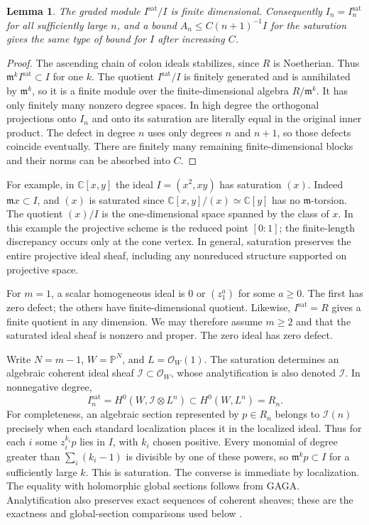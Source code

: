 \documentclass[11pt,reqno]{amsart}
\numberwithin{equation}{section}
\newtheorem{lemma}[theorem]{Lemma}
\theoremstyle{definition}
\theoremstyle{remark}
\newcommand{\C}{\mathbb C}
\newcommand{\Pj}{\mathbb P}
\newcommand{\cO}{\mathcal O}
\newcommand{\cI}{\mathcal I}
\begin{document}
\begin{lemma}\label{geo:saturation}
The graded module $I^{\mathrm{sat}}/I$ is finite dimensional.
Consequently $I_n=I_n^{\mathrm{sat}}$ for all sufficiently large $n$,
and a bound $A_n\le C(n+1)^{-1}I$ for the saturation gives the same
type of bound for $I$ after increasing $C$.
\end{lemma}
\begin{proof}
The ascending chain of colon ideals stabilizes, since $R$ is Noetherian.
Thus $\mathfrak m^k I^{\mathrm{sat}}\subset I$ for one $k$.
The quotient $I^{\mathrm{sat}}/I$ is finitely generated and is annihilated
by $\mathfrak m^k$, so it is a finite module over the finite-dimensional
algebra $R/\mathfrak m^k$.  It has only finitely many nonzero degree
spaces.  In high degree the orthogonal projections onto $I_n$ and onto
its saturation are literally equal in the original inner product.
The defect in degree $n$ uses only degrees $n$ and $n+1$, so those
defects coincide eventually.  There are finitely many remaining
finite-dimensional blocks and their norms can be absorbed into $C$.
\end{proof}

For example, in $\C[x,y]$ the ideal $I=(x^2,xy)$ has saturation $(x)$.
Indeed $\mathfrak m x\subset I$, and $(x)$ is saturated since
$\C[x,y]/(x)\simeq\C[y]$ has no $\mathfrak m$-torsion. The quotient
$(x)/I$ is the one-dimensional space spanned by the class of $x$.
In this example the projective scheme is the reduced point $[0:1]$;
the finite-length discrepancy occurs only at the cone vertex. In general,
saturation preserves the entire projective ideal sheaf, including any
nonreduced structure supported on projective space.

For $m=1$, a scalar homogeneous ideal is $0$ or $(z_1^a)$ for some
$a\ge0$.  The first has zero defect; the others have finite-dimensional
quotient.  Likewise, $I^{\mathrm{sat}}=R$ gives a finite quotient in
any dimension.  We may therefore assume $m\ge2$ and that the saturated
ideal sheaf is nonzero and proper.  The zero ideal has zero defect.

Write $N=m-1$, $W=\Pj^N$, and $L=\cO_W(1)$.  The saturation determines
an algebraic coherent ideal sheaf $\cI\subset\cO_W$, whose
analytification is also denoted $\cI$.  In nonnegative degree,
\begin{equation}\label{eq:geo-sections}
 I^{\mathrm{sat}}_n=H^0(W,\cI\otimes L^n)\subset H^0(W,L^n)=R_n.
\end{equation}
For completeness, an algebraic section represented by $p\in R_n$
belongs to $\cI(n)$ precisely when each standard localization places
it in the localized ideal.  Thus for each $i$ some $z_i^{k_i}p$ lies
in $I$, with $k_i$ chosen positive.  Every monomial of degree greater than
$\sum_i(k_i-1)$ is divisible by one of these powers, so
$\mathfrak m^kp\subset I$ for a sufficiently large $k$.
This is saturation.  The converse is immediate by localization.
The equality with holomorphic global sections follows from GAGA.
Analytification also preserves exact sequences of coherent sheaves;
these are the exactness and global-section comparisons used below
\cite{SerreGAGA}.
\end{document}
